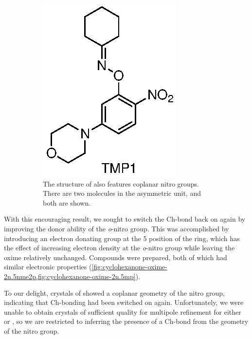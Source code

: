 \begin{refsection}
\begin{figure}
\begin{subfigure}[b]{0.47\linewidth}
        \includegraphics[scale=0.74]{Figures/cyclohexanone-oxime-2n-5mp.eps}
        \caption[Structure of .]{The structure of  also features coplanar nitro groups. There are two molecules in the asymmetric unit, and both are shown.}\label{fig:cyclohexanone-oxime-2n.5mp}
    \end{subfigure}
    \caption[Structures of .]{}
\end{figure}

With this encouraging result, we sought to switch the Ch-bond back on again by improving the donor ability of the \emph{o}-nitro group.
This was accomplished by introducing an electron donating group at the 5 position of the ring, which has the effect of increasing electron density at the \emph{o}-nitro group while leaving the oxime relatively unchanged.
Compounds  were prepared, both of which had similar electronic properties (\cref{fig:cyclohexanone-oxime-2n.5nme2p,fig:cyclohexanone-oxime-2n.5mp}).

To our delight, crystals of  showed a coplanar geometry of the nitro group, indicating that Ch-bonding had been switched on again.
Unfortunately, we were unable to obtain crystals of sufficient quality for multipole refinement for either  or , so we are restricted to inferring the presence of a Ch-bond from the geometry of the nitro group.


\end{refsection}

